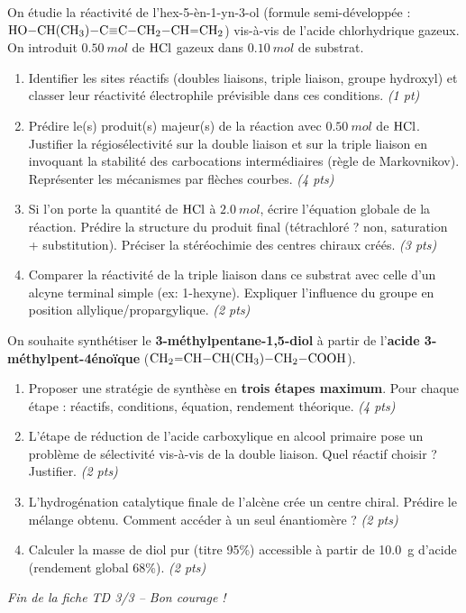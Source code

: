 \documentclass[11pt]{article}
\begin{document}
\begin{exercice}
On étudie la réactivité de l'hex-5-èn-1-yn-3-ol (formule semi-développée : $\ce{HO-CH(CH3)-C#C-CH2-CH=CH2}$) vis-à-vis de l'acide chlorhydrique gazeux. On introduit $\SI{0,50}{mol}$ de $\ce{HCl}$ gazeux dans $\SI{0,10}{mol}$ de substrat.
\begin{enumerate}[label=\arabic*., ref=\arabic*, leftmargin=*, itemsep=6pt]
    \item Identifier les sites réactifs (doubles liaisons, triple liaison, groupe hydroxyl) et classer leur réactivité électrophile prévisible dans ces conditions. \textit{(1 pt)}
    \item Prédire le(s) produit(s) majeur(s) de la réaction avec $\SI{0,50}{mol}$ de $\ce{HCl}$. Justifier la régiosélectivité sur la double liaison et sur la triple liaison en invoquant la stabilité des carbocations intermédiaires (règle de Markovnikov). Représenter les mécanismes par flèches courbes. \textit{(4 pts)}
    \item Si l'on porte la quantité de $\ce{HCl}$ à $\SI{2,0}{mol}$, écrire l'équation globale de la réaction. Prédire la structure du produit final (tétrachloré ? non, saturation + substitution). Préciser la stéréochimie des centres chiraux créés. \textit{(3 pts)}
    \item Comparer la réactivité de la triple liaison dans ce substrat avec celle d'un alcyne terminal simple (ex: 1-hexyne). Expliquer l'influence du groupe  en position allylique/propargylique. \textit{(2 pts)}
\end{enumerate}
\end{exercice}

\begin{exercice}
On souhaite synthétiser le \textbf{3-méthylpentane-1,5-diol} à partir de l'\textbf{acide 3-méthylpent-4énoïque} ($\ce{CH2=CH-CH(CH3)-CH2-COOH}$).
\begin{enumerate}[label=\arabic*., ref=\arabic*, leftmargin=*, itemsep=6pt]
    \item Proposer une stratégie de synthèse en \textbf{trois étapes maximum}. Pour chaque étape : réactifs, conditions, équation, rendement théorique. \textit{(4 pts)}
    \item L'étape de réduction de l'acide carboxylique en alcool primaire pose un problème de sélectivité vis-à-vis de la double liaison. Quel réactif choisir ? Justifier. \textit{(2 pts)}
    \item L'hydrogénation catalytique finale de l'alcène crée un centre chiral. Prédire le mélange obtenu. Comment accéder à un seul énantiomère ? \textit{(2 pts)}
    \item Calculer la masse de diol pur (titre 95\%) accessible à partir de \SI{10,0}{g} d'acide (rendement global 68\%). \textit{(2 pts)}
\end{enumerate}
\end{exercice}

\vfill
\noindent\hrulefill
\noindent\textit{Fin de la fiche TD 3/3 -- Bon courage !}
\end{document}
